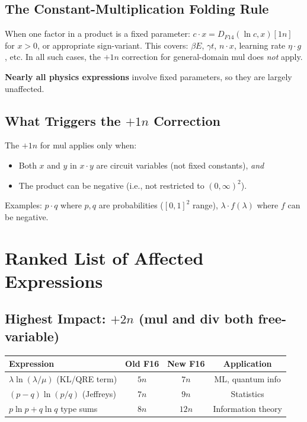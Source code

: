 \documentclass[11pt]{article}
\begin{document}
\subsection{The Constant-Multiplication Folding Rule}

When one factor in a product is a fixed parameter:
$c \cdot x = D_{F14}(\ln c, x)[1n]$ for $x > 0$, or appropriate sign-variant.
This covers: $\beta E$, $\gamma t$, $n \cdot x$, learning rate $\eta \cdot g$, etc.
In all such cases, the $+1n$ correction for general-domain mul does \emph{not} apply.

\textbf{Nearly all physics expressions} involve fixed parameters, so they are largely unaffected.

\subsection{What Triggers the $+1n$ Correction}

The $+1n$ for mul applies only when:
\begin{itemize}
  \item Both $x$ and $y$ in $x \cdot y$ are circuit variables (not fixed constants), \emph{and}
  \item The product can be negative (i.e., not restricted to $(0,\infty)^2$).
\end{itemize}

Examples: $p \cdot q$ where $p,q$ are probabilities ($[0,1]^2$ range), $\lambda \cdot f(\lambda)$ where $f$ can be negative.

\section{Ranked List of Affected Expressions}

\subsection{Highest Impact: $+2n$ (mul and div both free-variable)}

\begin{center}
\begin{tabular}{lccc}
\toprule
Expression & Old F16 & New F16 & Application \\
\midrule
$\lambda\ln(\lambda/\mu)$ (KL/QRE term) & $5n$ & $7n$ & ML, quantum info \\
$(p-q)\ln(p/q)$ (Jeffreys) & $7n$ & $9n$ & Statistics \\
$p\ln p + q\ln q$ type sums & $8n$ & $12n$ & Information theory \\
\bottomrule
\end{tabular}
\end{center}
\end{document}
